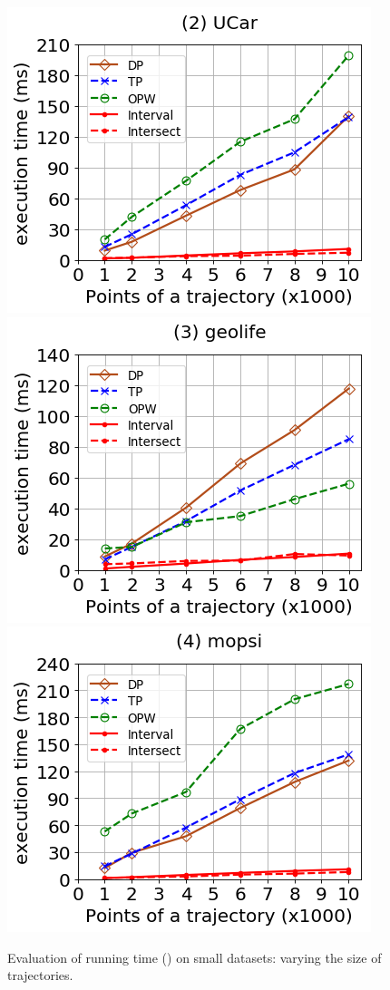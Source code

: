 \begin{figure}[tb!]
	\centering
	\includegraphics[scale=0.320]{Figures/Exp-DAD-time-size-service.png} 	\hspace{3ex}
	\includegraphics[scale=0.320]{Figures/Exp-DAD-time-size-geolife.png}	\hspace{3ex}
	\includegraphics[scale=0.320]{Figures/Exp-DAD-time-size-mopsi.png}		
	\vspace{-2ex}
	\caption{\small Evaluation of running time (\dad) on small datasets: varying the size of trajectories.}\label{fig:time-size-dad}
	\vspace{-2ex}
\end{figure}

